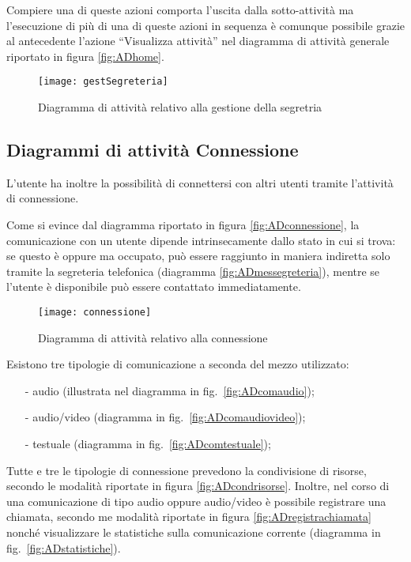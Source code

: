 Compiere una di queste azioni comporta l'uscita dalla sotto-attività ma l'esecuzione di più di una di queste azioni in sequenza è comunque possibile grazie al  antecedente l'azione ``Visualizza attività'' nel diagramma di attività generale riportato in figura \vref{fig:ADhome}.

\begin{figure}[H]
  \centering
  \texttt{[image: gestSegreteria]}
  \caption{Diagramma di attività relativo alla gestione della segretria}\label{fig:ADgestionesegreteria}
\end{figure}

\subsection{Diagrammi di attività Connessione}
L'utente ha inoltre la possibilità di connettersi con altri utenti tramite l'attività di connessione.

Come si evince dal diagramma riportato in figura \vref{fig:ADconnessione}, la comunicazione con un utente dipende intrinsecamente dallo stato in cui si trova: se questo è  oppure  ma occupato, può essere raggiunto in maniera indiretta solo tramite la segreteria telefonica (diagramma \ref{fig:ADmessegreteria}), mentre se l'utente è disponibile può essere contattato immediatamente.

\begin{figure}[H]
  \centering
  \texttt{[image: connessione]}
  \caption{Diagramma di attività relativo alla connessione}\label{fig:ADconnessione}
\end{figure}

Esistono tre tipologie di comunicazione a seconda del mezzo utilizzato:
\begin{itemize}[noitemsep,nolistsep]
  \item[-] audio (illustrata nel diagramma in fig.~\ref{fig:ADcomaudio});
  \item[-] audio/video (diagramma in fig.~\ref{fig:ADcomaudiovideo});
  \item[-] testuale (diagramma in fig.~\ref{fig:ADcomtestuale});
\end{itemize}


Tutte e tre le tipologie di connessione prevedono la condivisione di risorse, secondo le modalità riportate in figura \ref{fig:ADcondrisorse}. Inoltre, nel corso di una comunicazione di tipo audio oppure audio/video è possibile registrare una chiamata, secondo me modalità riportate in figura \ref{fig:ADregistrachiamata} nonché visualizzare le statistiche sulla comunicazione corrente (diagramma in fig.~\vref{fig:ADstatistiche}).

